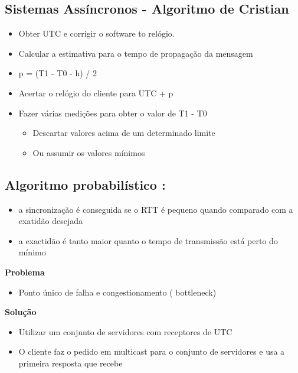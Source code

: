 \documentclass{article}
\begin{document}
\subsection{Sistemas Assíncronos - Algoritmo de Cristian}


\begin{itemize}
    \item Obter UTC e corrigir o software to relógio.
    
    \item Calcular a estimativa para o tempo de propagação da mensagem
    
    \item p = (T1 - T0 - h) / 2
    
    
    \item Acertar o relógio do cliente para UTC + p 
    
    
    \item Fazer várias medições para obter o valor de T1 - T0
    \begin{itemize}
        \item Descartar valores acima de um determinado limite
        \item Ou assumir os valores mínimos
    \end{itemize}
    
\end{itemize}



\subsection{Algoritmo probabilístico : }

\begin{itemize}
    \item a sincronização é conseguida se o RTT é pequeno quando comparado com a exatidão desejada
    \item a exactidão é tanto maior quanto o tempo de transmissão está perto do mínimo
\end{itemize}



\textbf{Problema}

\begin{itemize}
    \item Ponto único de falha e congestionamento ( bottleneck)

\end{itemize}

\textbf{Solução}
\begin{itemize}
    \item Utilizar um conjunto de servidores com receptores de UTC 
    \item O cliente faz o pedido em multicast para o conjunto de servidores e usa a primeira resposta que recebe
\end{itemize}
\end{document}
